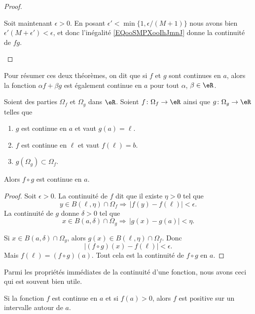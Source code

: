 \begin{proof}
\begin{subproof}
		Soit maintenant \( \epsilon>0\). En posant \( \epsilon'<\min\{ 1,\epsilon/(M+1) \}\) nous avons bien \( \epsilon'(M+\epsilon')<\epsilon\), et donc l'inégalité \eqref{EQooSMPXooIhJmnJ} donne la continuité de \( fg\).
	\end{subproof}
\end{proof}

Pour résumer ces deux théorèmes, on dit que si \( f\) et \( g\) sont continues en \( a\), alors la fonction \( \alpha f+\beta g\) est également continue en \( a\) pour tout \( \alpha\), \( \beta\in\eR\).

\begin{proposition}     \label{PROPooVNKVooJvxarf}
	Soient des parties \( \Omega_f\) et \( \Omega_g\) dans \( \eR\). Soient \( f\colon \Omega_f\to \eR\) ainsi que \( g\colon \Omega_g\to \eR\) telles que
	\begin{enumerate}
		\item
		      \( g\) est continue en \( a\) et vaut \( g(a)=\ell\).
		\item
		      \( f\) est continue en \( \ell\) et vaut \( f(\ell)=b\).
		\item
		      \( g(\Omega_g)\subset \Omega_f\).
	\end{enumerate}
	Alors \( f\circ g\) est continue en \( a\).
\end{proposition}

\begin{proof}
	Soit \( \epsilon>0\). La continuité de \( f\) dit que il existe \( \eta>0\) tel que
	\begin{equation}
		y\in B(\ell,\eta)\cap\Omega_f\Rightarrow\,| f(y)-f(\ell) |<\epsilon.
	\end{equation}
	La continuité de \( g\) donne \( \delta>0\) tel que
	\begin{equation}
		x\in B(a,\delta)\cap\Omega_g\Rightarrow\,| g(x)-g(a) |<\eta.
	\end{equation}

	Si \( x\in B(a,\delta)\cap\Omega_g\), alors \( g(x)\in B(\ell,\eta)\cap\Omega_f\). Donc
	\begin{equation}
		| (f\circ g)(x)-f(\ell) |<\epsilon.
	\end{equation}
	Mais \( f(\ell)=(f\circ g)(a)\). Tout cela est la continuité de \( f\circ g\) en \( a\).
\end{proof}


Parmi les propriétés immédiates de la continuité d'une fonction, nous avons ceci qui est souvent bien utile.

\begin{corollary}   \label{CorNNPYooMbaYZg}
	Si la fonction \( f\) est continue en \( a\) et si \( f(a)>0\), alors \( f\) est positive sur un intervalle autour de \( a\).
\end{corollary}

